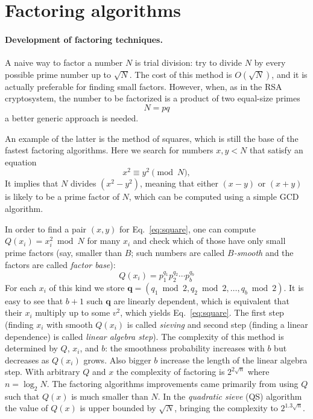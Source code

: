\documentclass[a4paper]{article}
\begin{document}
\section{Factoring algorithms}

\paragraph{Development of factoring techniques.}
A naive way to factor a number $N$ is trial division: try to divide $N$ by every possible prime number up to $\sqrt{N}$. The cost of this method is $O(\sqrt{N})$, and it is actually preferable for finding small factors. However, when, as in the RSA cryptosystem, the number to be factorized is a product of two equal-size primes
$$
N = pq
$$
a better generic approach is needed.

An example of the latter is the method of squares, which is still the base of the fastest factoring algorithms. Here we search for numbers $x,y <N$ that satisfy an equation
\begin{equation}\label{eq:square}
x^2 \equiv y^2 \pmod{N},
\end{equation}
It implies that $N$ divides $(x^2-y^2)$, meaning that  either $(x-y)$ or $(x+y)$ is likely to be a prime factor of $N$, which can be computed using a simple GCD algorithm. 

In order to find a pair $(x,y)$ for Eq.~\eqref{eq:square}, one can compute $Q(x_i) = x_i^2\bmod{N}$ for many $x_i$ and check which of those have only small prime factors (say, smaller than $B$; such numbers are called \emph{$B$-smooth} and the factors are called \emph{factor base}): 
$$
Q(x_i) = p_1^{q_1}p_2^{q_2}\cdots p_b^{q_b}
$$For each $x_i$ of this kind we store $\mathbf{q}=(q_1 \bmod 2,q_2 \bmod 2,\ldots,q_b \bmod 2)$. It is easy to see that $b+1$ such $\mathbf{q}$ are linearly dependent, which is equivalent that their $x_i$ multiply up to some $v^2$, which yields Eq.~\eqref{eq:square}. The first step (finding $x_i$ with smooth $Q(x_i)$ is called \emph{sieving} and second step (finding a linear dependence) is called \emph{linear algebra step}).
The complexity of this method is determined by $Q$, $x_i$, and $b$: the smoothness probability increases with $b$ but decreases as $Q(x_i)$ grows. Also bigger $b$ increase the length of the linear algebra step. With arbitrary $Q$ and $x$ the complexity of factoring is $2^{2\sqrt{n}}$ where $n=\log_2 N$.  The factoring algorithms improvements came primarily from using $Q$ such that $Q(x)$ is much smaller than $N$. In the  \emph{quadratic  sieve} (QS) algorithm~\cite{DBLP:conf/eurocrypt/Pomerance84} the value of $Q(x)$ is upper bounded by $\sqrt{N}$, bringing the complexity to $2^{1.3\sqrt{n}}$. 
\end{document}
